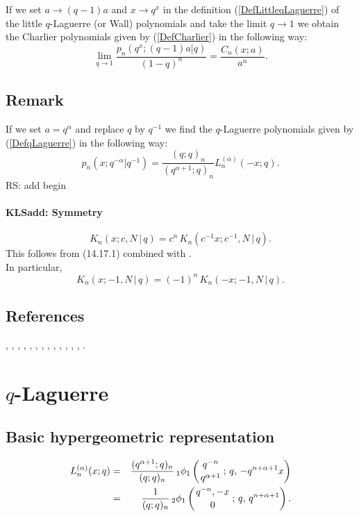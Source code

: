 \documentclass[envcountchap,graybox]{svmono}
\newcounter{rom}
\newcommand{\qhyp}[5]{\mbox{}_{#1}{\phi}_{#2}
\left(\genfrac{}{}{0pt}{}{#3}{#4}\,;\,q,\,#5\right)}
\newcommand\sa{\smallskipamount}
\newcommand\sLP{\\[\sa]}
\newcommand{\qhyp}[5]{\,\mbox{}_{#1}\phi_{#2}\!\left(
  \genfrac{}{}{0pt}{}{#3}{#4};#5\right)}
\begin{document}
{{If we set $a\rightarrow (q-1)a$ and $x\rightarrow q^x$ in the definition (\ref{DefLittleqLaguerre})
of the little $q$-Laguerre (or Wall) polynomials and take the limit $q\rightarrow 1$ we obtain
the Charlier polynomials given by (\ref{DefCharlier}) in the following way:
\begin{equation}
\lim_{q\rightarrow 1}\frac{p_n(q^x;(q-1)a|q)}{(1-q)^n}=
\frac{C_n(x;a)}{a^n}.
\end{equation}

\subsection*{Remark} If we set $a=q^{\alpha}$ and replace $q$ by $q^{-1}$ we find the
$q$-Laguerre polynomials given by (\ref{DefqLaguerre}) in the following
way:
$$p_n(x;q^{-\alpha}|q^{-1})=\frac{(q;q)_n}{(q^{\alpha+1};q)_n}L_n^{(\alpha)}(-x;q).$$
 RS: add begin\label{sec14.17}
%
\paragraph{\large\bf KLSadd: Symmetry}\begin{equation}
K_n(x;c,N\,|\, q)=c^n\,K_n(c^{-1}x;c^{-1},N\,|\, q).
\label{87}
\end{equation}
This follows from (14.17.1) combined with .
\sLP
In particular,
\begin{equation}
K_n(x;-1,N\,|\, q)=(-1)^n\,K_n(-x;-1,N\,|\, q).
\label{88}
\end{equation}
%

\subsection*{References}
\cite{AlSalam90}, \cite{AlSalamVerma82I}, \cite{AtakAtakI},
\cite{Chihara68II}, \cite{Chihara78}, \cite{Chihara79}, \cite{DattaGriffin},
\cite{FlorisKoelink}, \cite{GasperRahman90}, \cite{Koorn90II}, \cite{Koorn91},
\cite{Nikiforov+}, \cite{VanAsscheKoorn}, \cite{Wall}.


\section{$q$-Laguerre}
\par\setcounter{equation}{0}

\subsection*{Basic hypergeometric representation}
\begin{eqnarray}
\label{DefqLaguerre}
L_n^{(\alpha)}(x;q)&=&\frac{(q^{\alpha+1};q)_n}{(q;q)_n}\,
\qhyp{1}{1}{q^{-n}}{q^{\alpha+1}}{-q^{n+\alpha+1}x}\\
&=&\frac{1}{(q;q)_n}\,\qhyp{2}{1}{q^{-n},-x}{0}{q^{n+\alpha+1}}.\nonumber
\end{eqnarray}

}}
\end{document}

